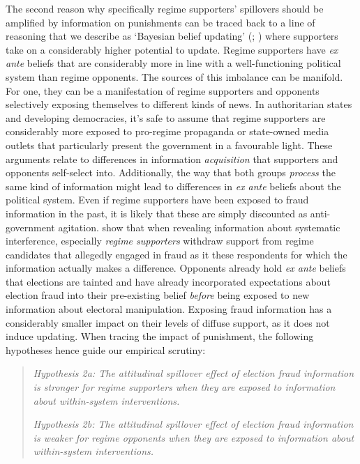 \documentclass[11pt, ngerman,english,a4]{article}
\begin{document}
The second reason why specifically regime supporters' spillovers should be amplified by information on punishments can be traced back to a line of reasoning that we describe as `Bayesian belief updating' (\citealt{Bullock2009}; \citealt{Hill2017}) where supporters take on a considerably higher potential to update. Regime supporters have \textit{ex ante} beliefs that are considerably more in line with a well-functioning political system than regime opponents. The sources of this imbalance can be manifold. For one, they can be a manifestation of regime supporters and opponents selectively exposing themselves to different kinds of news. In authoritarian states and developing democracies, it's safe to assume that regime supporters are considerably more exposed to pro-regime propaganda or state-owned media outlets that particularly present the government in a favourable light. These arguments relate to differences in information \textit{acquisition} that supporters and opponents self-select into. Additionally, the way that both groups \textit{process} the same kind of information might lead to differences in \textit{ex ante} beliefs about the political system. Even if regime supporters have been exposed to fraud information in the past, it is likely that these are simply discounted as anti-government agitation. \citet{Reuter2019} show that when revealing information about systematic interference, especially \textit{regime supporters} withdraw support from regime candidates that allegedly engaged in fraud as it these respondents for which the information actually makes a difference. Opponents already hold \textit{ex ante} beliefs that elections are tainted and have already incorporated expectations about election fraud into their pre-existing belief \textit{before} being exposed to new information about electoral manipulation. Exposing fraud information has a considerably smaller impact on their levels of diffuse support, as it does not induce updating. When tracing the impact of punishment, the following hypotheses hence guide our empirical scrutiny: 

\begin{quote}
	\singlespace
	\noindent \textit{Hypothesis 2a: The attitudinal spillover effect of election fraud information is stronger for regime supporters when they are exposed to information about within-system interventions.}
	
	\noindent \textit{Hypothesis 2b: The attitudinal spillover effect of election fraud information is weaker for regime opponents when they are exposed to information about within-system interventions.}
\end{quote}
\end{document}
